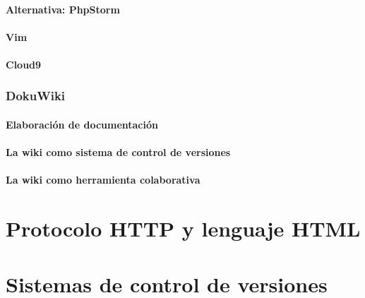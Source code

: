 \documentclass[a4paper,11pt,spanish]{sphinxmanual}
\begin{document}
\subsubsection{Alternativa: PhpStorm}
\label{\detokenize{introduccion:alternativa-phpstorm}}

\subsubsection{Vim}
\label{\detokenize{introduccion:vim}}

\subsubsection{Cloud9}
\label{\detokenize{introduccion:cloud9}}

\subsection{DokuWiki}
\label{\detokenize{introduccion:dokuwiki}}

\subsubsection{Elaboración de documentación}
\label{\detokenize{introduccion:elaboracion-de-documentacion}}

\subsubsection{La wiki como sistema de control de versiones}
\label{\detokenize{introduccion:la-wiki-como-sistema-de-control-de-versiones}}

\subsubsection{La wiki como herramienta colaborativa}
\label{\detokenize{introduccion:la-wiki-como-herramienta-colaborativa}}

\chapter{Protocolo HTTP y lenguaje HTML}
\label{\detokenize{introduccion:protocolo-http-y-lenguaje-html}}

\chapter{Sistemas de control de versiones}
\label{\detokenize{introduccion:sistemas-de-control-de-versiones}}
\end{document}
